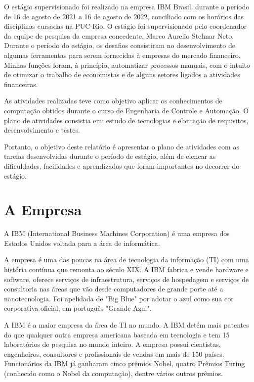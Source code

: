 \documentclass[english,brazil,oneside]{ifestagio}
\begin{document}
O estágio supervisionado foi realizado na empresa IBM Brasil. durante o período de 16 de agosto de 2021 a 16 de agosto de 2022, conciliado com os horários das disciplinas cursadas na PUC-Rio. O estágio foi supervisionado pelo coordenador da equipe de pesquisa da empresa concedente, Marco Aurelio Stelmar Neto.
Durante o período do estágio, os desafios consistiram no desenvolvimento de algumas ferramentas para serem fornecidas à empresas do mercado financeiro. Minhas funções foram, à princípio, automatizar processos manuais, com o intuito de otimizar o trabalho de economistas e de alguns setores ligados a atividades financeiras.

As atividades realizadas teve como objetivo aplicar os conhecimentos de computação obtidos durante o curso de Engenharia de Controle e Automação. O plano de atividades consistia em: estudo de tecnologias e elicitação de requisitos, desenvolvimento e testes.

Portanto, o objetivo deste relatório é apresentar o plano de atividades com as tarefas
desenvolvidas durante o período de estágio, além de elencar as dificuldades, facilidades e
aprendizados que foram importantes no decorrer do estágio.


\chapter{A Empresa} \label{cap:empresa}

A IBM (International Business Machines Corporation) é uma empresa dos Estados Unidos voltada para a área de informática. 

A empresa é uma das poucas na área de tecnologia da informação (TI) com uma história contínua que remonta ao século XIX. A IBM fabrica e vende hardware e software, oferece serviços de infraestrutura, serviços de hospedagem e serviços de consultoria nas áreas que vão desde computadores de grande porte até a nanotecnologia. Foi apelidada de "Big Blue" por adotar o azul como sua cor corporativa oficial, em português "Grande Azul".

A IBM é a maior empresa da área de TI no mundo. A IBM detém mais patentes do que qualquer outra empresa americana baseada em tecnologia e tem 15 laboratórios de pesquisa no mundo inteiro. A empresa possui cientistas, engenheiros, consultores e profissionais de vendas em mais de 150 países. Funcionários da IBM já ganharam cinco prêmios Nobel, quatro Prêmios Turing (conhecido como o Nobel da computação), dentre vários outros prêmios.
\end{document}
